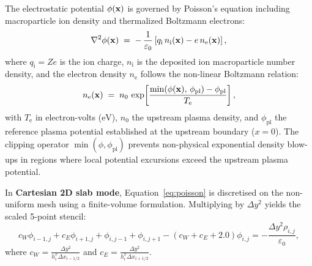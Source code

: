 \documentclass[11pt,a4paper]{article}
\begin{document}
The electrostatic potential $\phi(\vb{x})$ is governed by Poisson's equation including macroparticle ion density and thermalized Boltzmann electrons:
\begin{equation}
    \nabla^{2}\phi(\vb{x}) \;=\; -\,\frac{1}{\varepsilon_{0}}
        \left[ q_{\mathrm{i}}\,n_{\mathrm{i}}(\vb{x}) - e\,n_{\mathrm{e}}(\vb{x}) \right],
    \label{eq:poisson}
\end{equation}
where $q_{\mathrm{i}} = Z e$ is the ion charge, $n_{\mathrm{i}}$ is the deposited ion macroparticle number density, and the electron density $n_{\mathrm{e}}$ follows the non-linear Boltzmann relation:
\begin{equation}
    n_{\mathrm{e}}(\vb{x}) \;=\; n_{0}\,
    \exp\!\left[\frac{\min(\phi(\vb{x}),\,\phi_{\mathrm{pl}}) - \phi_{\mathrm{pl}}}{T_{\mathrm{e}}}\right],
    \label{eq:boltzmann}
\end{equation}
with $T_{\mathrm{e}}$ in electron-volts ($\si{\eV}$), $n_0$ the upstream plasma density, and $\phi_{\mathrm{pl}}$ the reference plasma potential established at the upstream boundary ($x = 0$). The clipping operator $\min(\phi, \phi_{\mathrm{pl}})$ prevents non-physical exponential density blow-ups in regions where local potential excursions exceed the upstream plasma potential.

In \textbf{Cartesian 2D slab mode}, Equation~\eqref{eq:poisson} is discretised on the non-uniform mesh using a finite-volume formulation. Multiplying by $\Delta y^2$ yields the scaled 5-point stencil:
\begin{equation}
    c_W \phi_{i-1,j} + c_E \phi_{i+1,j} + \phi_{i,j-1} + \phi_{i,j+1} - (c_W + c_E + 2.0)\phi_{i,j}
    = -\frac{\Delta y^2 \rho_{i,j}}{\varepsilon_{0}},
\end{equation}
where $c_W = \frac{\Delta y^2}{h_i^x \Delta x_{i-1/2}}$ and $c_E = \frac{\Delta y^2}{h_i^x \Delta x_{i+1/2}}$.
\end{document}
